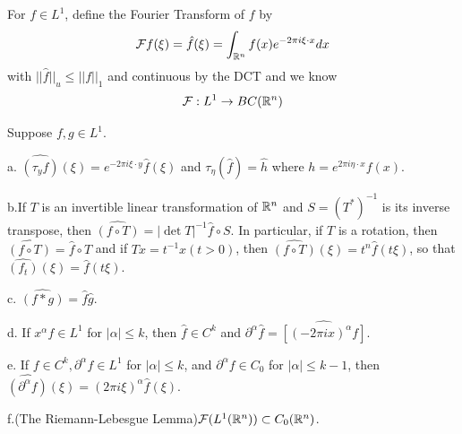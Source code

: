 \begin{definition}
    For $f\in L^1$, define the Fourier Transform of $f$ by
    \[\mathcal{F} f(\xi) = \hat{f}(\xi) = \int_{\mathbb{R}^n}f(x)e^{-2\pi i\xi\cdot x} dx\]
    with $||\hat{f}||_u \leq ||f||_1$ and continuous by the DCT and we know
    \[\mathcal{F}:L^1 \to BC(\mathbb{R}^n)\]
\end{definition}
\begin{theorem}
    Suppose $f,g\in L^1$.\par
    a. $\hat{(\tau_y f)}(\xi) = e^{-2\pi i \xi\cdot y}\hat{f}(\xi)$ and $\tau_{\eta}(\hat{f}) = \hat{h}$ where $h = e^{2\pi i \eta\cdot x}f(x)$.\par
    b.If $T$ is an invertible linear transformation of $\mathbb{R}^n$ and $S = (T^*)^{-1}$ is its inverse transpose, then $\hat{(f\circ T)} = |\det T|^{-1} \hat{f}\circ S$. In particular, if $T$ is a rotation, then $\hat{(f\circ T)} = \hat{f}\circ T$ and if $Tx = t^{-1}x(t>0)$, then $\hat{(f\circ T)}(\xi) = t^n\hat{f}(t\xi)$, so that $\hat{(f_t)}(\xi) = \hat{f}(t\xi)$.\par
    c. $\hat{(f*g)} = \hat{f}\hat{g}$.\par
    d. If $x^{\alpha}f\in L^1$ for $|\alpha|\leq k$, then $\hat{f}\in C^k$ and $\partial^{\alpha}\hat{f} = \hat{[(-2\pi i x)^{\alpha}f]}$.\par
    e. If $f\in C^k,\partial^{\alpha} f \in L^1$ for $|\alpha|\leq k$, and $\partial^{\alpha}f\in C_0$ for $|\alpha|\leq k -1$, then $\hat{(\partial^{\alpha}f)}(\xi) = (2\pi i \xi)^{\alpha}\hat{f}(\xi)$.\par
    f.(The Riemann-Lebesgue Lemma)$\mathcal{F}(L^1(\mathbb{R}^n)) \subset C_0(\mathbb{R}^n)$.
\end{theorem}
